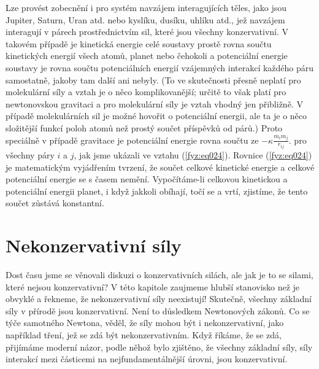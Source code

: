     Lze provést zobecnění i pro systém navzájem interagujících těles, jako jsou Jupiter, Saturn, 
    Uran atd. nebo kyslíku, dusíku, uhlíku atd., jež navzájem interagují v párech prostřednictvím 
    sil, které jsou všechny konzervativní. V takovém případě je kinetická energie celé soustavy 
    prostě rovna součtu kinetických energií všech atomů, planet nebo čehokoli a potenciální energie 
    soustavy je rovna součtu potenciálních energií vzájemných interakcí každého páru samostatně, 
    jakoby tam další ani nebyly. (To ve skutečnosti přesně neplatí pro molekulární síly a vztah je 
    o něco komplikovanější; určitě to však platí pro newtonovskou gravitaci a pro molekulární síly 
    je vztah vhodný jen přibližně. V případě molekulárních sil je možné hovořit o potenciální 
    energii, ale ta je o něco složitější funkcí poloh atomů než prostý součet příspěvků od párů.) 
    Proto speciálně v případě gravitace je potenciální energie rovna součtu ze \(- \kappa 
    \frac{m_im_j}{r_{ij}}.\) pro všechny páry \(i\) a \(j\), jak jsme ukázali ve vztahu 
    (\ref{fyz:eq024}). Rovnice (\ref{fyz:eq024}) je matematickým vyjádřením tvrzení, že součet 
    celkové kinetické energie a celkové potenciální energie se s časem nemění. Vypočítáme-li 
    celkovou kinetickou a potenciální energii planet, i když jakkoli obíhají, točí se a vrtí, 
    zjistíme, že tento součet zůstává konstantní.
    
  \section{Nekonzervativní síly}
    Dost času jsme se věnovali diskuzi o konzervativních silách, ale jak je to se silami, které 
    nejsou konzervativní? V této kapitole zaujmeme hlubší stanovisko než je obvyklé a řekneme, že 
    nekonzervativní síly neexistují! Skutečně, všechny základní síly v přírodě jsou konzervativní. 
    Není to důsledkem Newtonových zákonů. Co se týče samotného Newtona, věděl, že síly mohou být i 
    nekonzervativní, jako například tření, jež se zdá být nekonzervativním. Když říkáme, že se zdá, 
    přijímáme moderní názor, podle něhož bylo zjištěno, že všechny základní síly, síly interakcí 
    mezi částicemi na nejfundamentálnější úrovni, jsou konzervativní.
    
